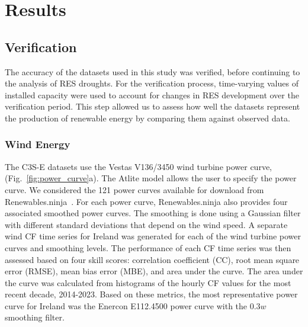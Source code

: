 \documentclass[a4paper, 11p1t]{article}
\begin{document}
\section{Results}
\label{sec:Results}

\subsection{Verification}
\label{sec:verification}

The accuracy of the datasets used in this study was verified, before continuing to the analysis of RES droughts. For the verification process, time-varying values of installed capacity were used to account for changes in RES development over the verification period. This step allowed us to assess how well the datasets represent the production of renewable energy by comparing them against observed data.

\subsubsection{Wind Energy}
\label{sec:wind_verification}

The C3S-E datasets use the Vestas V136/3450 wind turbine power curve, (Fig.~\ref{fig:power_curve}a). The Atlite model allows the user to specify the power curve. We considered the 121 power curves available for download from Renewables.ninja~\cite{staffell2016wake}. For each power curve, Renewables.ninja also provides four associated smoothed power curves. The smoothing is done using a Gaussian filter with different standard deviations that depend on the wind speed. A separate wind CF time series for Ireland was generated for each of the wind turbine power curves and smoothing levels. The performance of each CF time series was then assessed based on four skill scores: correlation coefficient (CC), root mean square error (RMSE), mean bias error (MBE), and area under the curve. The area under the curve was calculated from histograms of the hourly CF values for the most recent decade, 2014-2023. Based on these metrics, the most representative power curve for Ireland was the Enercon E112.4500 power curve with the $0.3w$  smoothing filter.
\end{document}

